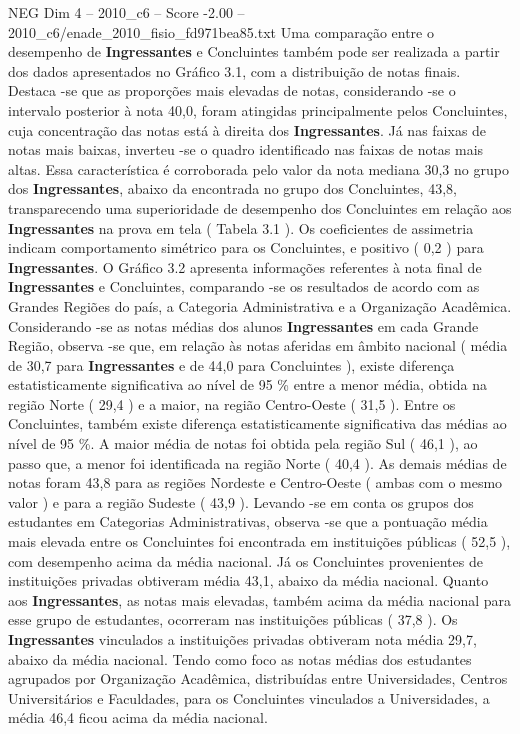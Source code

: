 \begin{textsample}{NEG Dim 4 – 2010\_c6 – Score -2.00 – 2010\_c6/enade\_2010\_fisio\_fd971bea85.txt}
Uma comparação entre o desempenho de \textbf{Ingressantes} e Concluintes também pode ser realizada a partir dos dados apresentados no Gráfico 3.1, com a distribuição de notas finais.
Destaca -se que as proporções mais elevadas de notas, considerando -se o intervalo posterior à nota 40,0, foram atingidas principalmente pelos Concluintes, cuja concentração das notas está à direita dos \textbf{Ingressantes}.
Já nas faixas de notas mais baixas, inverteu -se o quadro identificado nas faixas de notas mais altas.
Essa característica é corroborada pelo valor da nota mediana 30,3 no grupo dos \textbf{Ingressantes}, abaixo da encontrada no grupo dos Concluintes, 43,8, transparecendo uma superioridade de desempenho dos Concluintes em relação aos \textbf{Ingressantes} na prova em tela ( Tabela 3.1 ).
Os coeficientes de assimetria indicam comportamento simétrico para os Concluintes, e positivo ( 0,2 ) para \textbf{Ingressantes}.
O Gráfico 3.2 apresenta informações referentes à nota final de \textbf{Ingressantes} e Concluintes, comparando -se os resultados de acordo com as Grandes Regiões do país, a Categoria Administrativa e a Organização Acadêmica.
Considerando -se as notas médias dos alunos \textbf{Ingressantes} em cada Grande Região, observa -se que, em relação às notas aferidas em âmbito nacional ( média de 30,7 para \textbf{Ingressantes} e de 44,0 para Concluintes ), existe diferença estatisticamente significativa ao nível de 95 \% entre a menor média, obtida na região Norte ( 29,4 ) e a maior, na região Centro-Oeste ( 31,5 ).
Entre os Concluintes, também existe diferença estatisticamente significativa das médias ao nível de 95 \%.
A maior média de notas foi obtida pela região Sul ( 46,1 ), ao passo que, a menor foi identificada na região Norte ( 40,4 ).
As demais médias de notas foram 43,8 para as regiões Nordeste e Centro-Oeste ( ambas com o mesmo valor ) e para a região Sudeste ( 43,9 ).
Levando -se em conta os grupos dos estudantes em Categorias Administrativas, observa -se que a pontuação média mais elevada entre os Concluintes foi encontrada em instituições públicas ( 52,5 ), com desempenho acima da média nacional.
Já os Concluintes provenientes de instituições privadas obtiveram média 43,1, abaixo da média nacional.
Quanto aos \textbf{Ingressantes}, as notas mais elevadas, também acima da média nacional para esse grupo de estudantes, ocorreram nas instituições públicas ( 37,8 ).
Os \textbf{Ingressantes} vinculados a instituições privadas obtiveram nota média 29,7, abaixo da média nacional.
Tendo como foco as notas médias dos estudantes agrupados por Organização Acadêmica, distribuídas entre Universidades, Centros Universitários e Faculdades, para os Concluintes vinculados a Universidades, a média 46,4 ficou acima da média nacional.

\end{textsample}
